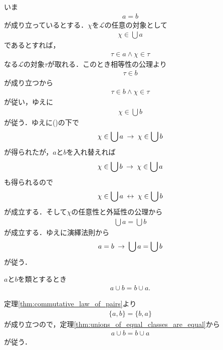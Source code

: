 	\begin{sketch}
		いま
		\begin{align}
			a = b
			\label{fom:thm_unions_of_equal_classes_are_equal}
		\end{align}
		が成り立っているとする．$\chi$を$\mathcal{L}$の任意の対象として
		\begin{align}
			\chi \in \bigcup a
		\end{align}
		であるとすれば，
		\begin{align}
			\tau \in a \wedge \chi \in \tau
		\end{align}
		なる$\mathcal{L}$の対象$\tau$が取れる．このとき相等性の公理より
		\begin{align}
			\tau \in b
		\end{align}
		が成り立つから
		\begin{align}
			\tau \in b \wedge \chi \in \tau
		\end{align}
		が従い，ゆえに
		\begin{align}
			\chi \in \bigcup b
		\end{align}
		が従う．ゆえに()の下で
		\begin{align}
			\chi \in \bigcup a \hspace{0.25em}\rightarrow\hspace{0.25em} \chi \in \bigcup b
		\end{align}
		が得られたが，$a$と$b$を入れ替えれば
		\begin{align}
			\chi \in \bigcup b \hspace{0.25em}\rightarrow\hspace{0.25em} \chi \in \bigcup a
		\end{align}
		も得られるので
		\begin{align}
			\chi \in \bigcup a \hspace{0.25em}\leftrightarrow\hspace{0.25em} \chi \in \bigcup b
		\end{align}
		が成立する．そして$\chi$の任意性と外延性の公理から
		\begin{align}
			\bigcup a = \bigcup b
		\end{align}
		が成立する．ゆえに演繹法則から
		\begin{align}
			a = b \hspace{0.25em}\rightarrow\hspace{0.25em} \bigcup a = \bigcup b
		\end{align}
		が従う．
		\QED
	\end{sketch}
	
	\begin{screen}
		\begin{thm}[合併の可換律]
			$a$と$b$を類とするとき
			\begin{align}
				a \cup b = b \cup a.
			\end{align}
		\end{thm}
	\end{screen}
	
	\begin{sketch}
		定理\ref{thm:commutative_law_of_pairs}より
		\begin{align}
			\{a,b\} = \{b,a\}
		\end{align}
		が成り立つので，定理\ref{thm:unions_of_equal_classes_are_equal}から
		\begin{align}
			a \cup b = b \cup a
		\end{align}
		が従う．
		\QED
	\end{sketch}